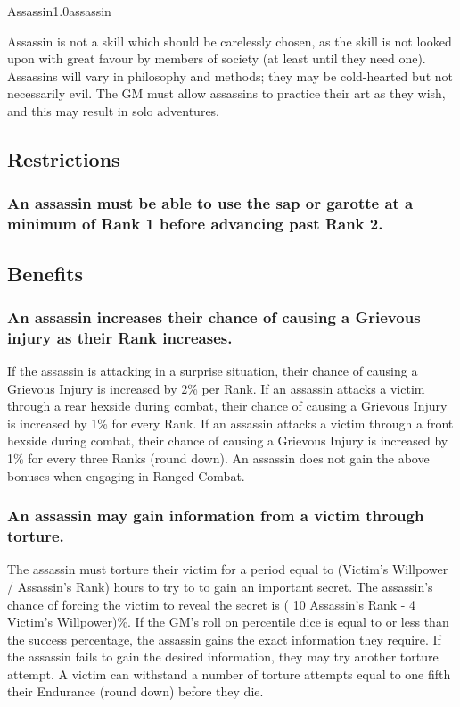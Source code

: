\begin{skill}{Assassin}{1.0}{assassin}

Assassin is not a skill which should be carelessly chosen, as the
skill is not looked upon with great favour by members of society (at
least until they need one).  Assassins will vary in philosophy and
methods; they may be cold-hearted but not necessarily evil.  The GM
must allow assassins to practice their art as they wish, and this may
result in solo adventures.

\subsection{Restrictions}

\subsubsection{An assassin must be able to use the sap or garotte at a
minimum of Rank 1 before advancing past Rank 2.}

\subsection{Benefits}

\subsubsection{An assassin increases their chance of causing a Grievous
injury as their Rank increases.}

If the assassin is attacking in a surprise situation, their chance of
causing a Grievous Injury is increased by 2\% per Rank.  If an
assassin attacks a victim through a rear hexside during combat, their
chance of causing a Grievous Injury is increased by 1\% for every
Rank.  If an assassin attacks a victim through a front hexside during
combat, their chance of causing a Grievous Injury is increased by 1\%
for every three Ranks (round down).  An assassin does not gain the
above bonuses when engaging in Ranged Combat.

\subsubsection{An assassin may gain information from a victim through
torture.}

The assassin must torture their victim for a period equal to (Victim's
Willpower / Assassin's Rank) hours to try to to gain an important
secret. The assassin's chance of forcing the victim to reveal the
secret is ( 10 \x Assassin's Rank - 4 \x Victim's Willpower)\%.  If
the GM's roll on percentile dice is equal to or less than the success
percentage, the assassin gains the exact information they require.  If
the assassin fails to gain the desired information, they may try
another torture attempt.  A victim can withstand a number of torture
attempts equal to one fifth their Endurance (round down) before they
die.


\end{skill}
